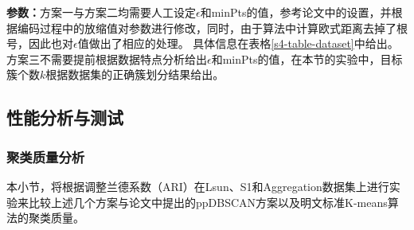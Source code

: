 \begin{table}[htbp]
	\centering
	\renewcommand{\arraystretch}{1.3}
	\caption{数据集参数设置详细信息}
	\label{s4-table-dataset}
\end{table}

\textbf{参数：}方案一与方案二均需要人工设定$\epsilon$和minPts的值，参考论文\cite{bozdemir2021privacy}中的设置，并根据编码过程中的放缩值对参数进行修改，同时，由于算法中计算欧式距离去掉了根号，因此也对$\epsilon$值做出了相应的处理。
具体信息在表格\ref{s4-table-dataset}中给出。
方案三不需要提前根据数据特点分析给出$\epsilon$和minPts的值，在本节的实验中，目标簇个数$ k $根据数据集的正确簇划分结果给出。

\subsection{性能分析与测试}
\subsubsection{聚类质量分析}
本小节，将根据调整兰德系数（ARI）在Lsun、S1和Aggregation数据集上进行实验来比较上述几个方案与论文\cite{bozdemir2021privacy}中提出的ppDBSCAN方案以及明文标准K-means算法的聚类质量。

